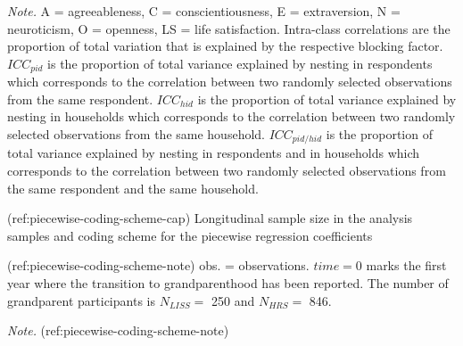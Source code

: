 \begin{appendix}
\begin{table}[h]
\begin{center}
\begin{threeparttable}
\begin{tablenotes}[para]
\normalsize{\textit{Note.} A = agreeableness, C = conscientiousness, E = extraversion, N = neuroticism, O = openness, LS = life satisfaction. Intra-class correlations are the proportion of total variation that is explained by the respective blocking factor. $ICC_{pid}$ is the proportion of total variance explained by nesting in respondents which corresponds to the correlation between two randomly selected observations from the same respondent. $ICC_{hid}$ is the proportion of total variance explained by nesting in households which corresponds to the correlation between two randomly selected observations from the same household. $ICC_{pid/hid}$ is the proportion of total variance explained by nesting in respondents and in households which corresponds to the correlation between two randomly selected observations from the same respondent and the same household.}
\end{tablenotes}

\end{threeparttable}
\end{center}

\end{table}

(ref:piecewise-coding-scheme-cap) Longitudinal sample size in the
analysis samples and coding scheme for the piecewise regression
coefficients

(ref:piecewise-coding-scheme-note) obs. = observations. \(time=0\) marks
the first year where the transition to grandparenthood has been
reported. The number of grandparent participants is \(N_{LISS}=\) 250
and \(N_{HRS}=\) 846.

\begin{lltable}

\begin{TableNotes}[para]
\normalsize{\textit{Note.} (ref:piecewise-coding-scheme-note)}
\end{TableNotes}

\small{

}
\end{lltable}
\end{appendix}
